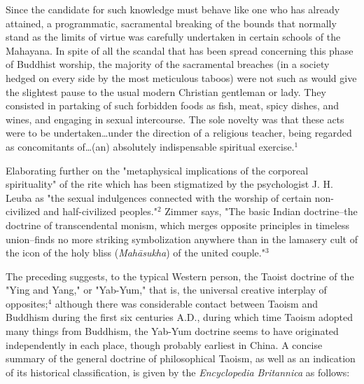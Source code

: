 \begin{center}
	\parbox{0.8\textwidth}{
		\hspace*{5mm}Since the candidate for such knowledge must behave like
		one who has already attained, a programmatic, sacramental
		breaking of the bounds that normally stand as the limits of
		virtue was carefully undertaken in certain schools of the
		Mahayana. In spite of all the scandal that has been spread
		concerning this phase of Buddhist worship, the majority of
		the sacramental breaches (in a society hedged on every side
		by the most meticulous taboos) were not such as would give
		the slightest pause to the usual modern Christian gentleman
		or lady. They consisted in partaking of such forbidden
		foods as fish, meat, spicy dishes, and wines, and engaging
		in sexual intercourse. The sole novelty was that these acts
		were to be undertaken\dots under the direction of a religious
		teacher, being regarded as concomitants of\dots (an) absolutely
		indispensable spiritual exercise.$^{1}$\linebreak
		\null\par
		\vspace*{-\baselineskip}
	}%
\end{center}
\hspace*{5mm}Elaborating further on the "metaphysical implications
of the corporeal spirituality" of the rite which has been
stigmatized by the psychologist J. H. Leuba as "the sexual
indulgences connected with the worship of certain non-civilized
and half-civilized peoples."$^{2}$ Zimmer says, "The
basic Indian doctrine--the doctrine of transcendental monism,
which merges opposite principles in timeless union--finds no
more striking symbolization anywhere than in the lamasery
cult of the icon of the holy bliss (\textit{Mahāsukha}) of the
united couple."$^{3}$\par
\vspace*{0.5\baselineskip}
The preceding suggests, to the typical Western person,
the Taoist doctrine of the "Ying and Yang," or "Yab-Yum," that
is, the universal creative interplay of opposites;$^{4}$ although
there was considerable contact between Taoism and Buddhism
during the first six centuries A.D., during which time Taoism
adopted many things from Buddhism, the Yab-Yum doctrine
seems to have originated independently in each place, though
probably earliest in China. A concise summary of the general
doctrine of philosophical Taoism, as well as an indication
of its historical classification, is given by the \textit{Encyclopedia}
\textit{Britannica} as follows:\par
